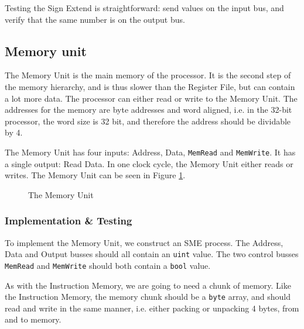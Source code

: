 Testing the Sign Extend is straightforward: send values on the input bus, and
verify that the same number is on the output bus.

\subsection{Memory unit}
The Memory Unit is the main memory of the processor. It is the second step of
the memory hierarchy, and is thus slower than the Register File, but can
contain a lot more data. The processor can either read or write to the Memory
Unit. The addresses for the memory are byte addresses and word aligned, i.e. in
the 32-bit processor, the word size is 32 bit, and therefore the address should
be dividable by 4.

The Memory Unit has four inputs: Address, Data, \texttt{MemRead} and
\texttt{MemWrite}. It has a single output: Read Data. In one clock cycle, the
Memory Unit either reads or writes. The Memory Unit can be seen in Figure
\ref{fig:mem}.
\begin{figure}
    \centering
    \caption{The Memory Unit}
    \label{fig:mem}
\end{figure}

\subsubsection*{Implementation \& Testing}
To implement the Memory Unit, we construct an SME process. The Address, Data
and Output busses should all contain an \texttt{uint} value. The two control
busses \texttt{MemRead} and \texttt{MemWrite} should both contain a
\texttt{bool} value.

As with the Instruction Memory, we are going to need a chunk of memory. Like
the Instruction Memory, the memory chunk should be a \texttt{byte} array, and
should read and write in the same manner, i.e. either packing or unpacking 4
bytes, from and to memory.

